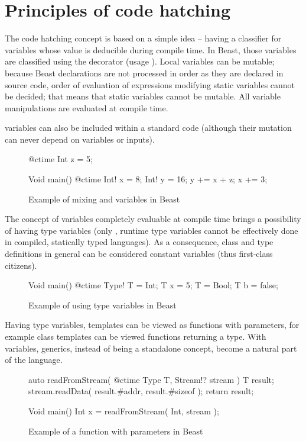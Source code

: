 \documentclass{ExcelAtFIT}
\begin{document}
\section{Principles of code hatching}

The code hatching concept is based on a simple idea -- having a classifier for variables whose value is deducible during compile time. In Beast, those variables are classified using the  decorator (usage ). Local \ctime variables can be mutable; because Beast declarations are not processed in order as they are declared in source code, order of evaluation of expressions modifying static \ctime variables cannot be decided; that means that static \ctime variables cannot be mutable. All \ctime variable manipulations are evaluated at compile time.

\ctime variables can also be included within a standard code (although their mutation can never depend on \nonctime variables or inputs).

\begin{figure}[h]
	\begin{code}
@ctime Int z = 5;
		
Void main() {
	@ctime Int! x = 8;
	Int! y = 16;
	y += x + z;
	x += 3;
}
	\end{code}
	\caption{Example of mixing \ctime and \nonctime variables in Beast}
\end{figure}

The concept of variables completely evaluable at compile time brings a possibility of having type variables (only \ctime, runtime type variables cannot be effectively done in compiled, statically typed languages). As a consequence, class and type definitions in general can be considered \ctime constant variables (thus first-class citizens).

\begin{figure}[h]
	\begin{code}
Void main() {
	@ctime Type! T = Int;
	T x = 5;
	T = Bool;
	T b = false;
}
	\end{code}
	\caption{Example of using type variables in Beast}
\end{figure}

Having type variables, templates can be viewed as functions with \ctime parameters, for example class templates can be viewed functions returning a type. With \ctime variables, generics, instead of being a standalone concept, become a natural part of the language.

\begin{figure}[h]
	\begin{code}
auto readFromStream( @ctime Type T, Stream!? stream )
{
	T result;
	stream.readData( result.#addr, result.#sizeof );
	return result;
}

Void main() {
	Int x = readFromStream( Int, stream );
}
	\end{code}
	\caption{Example of a function with \ctime parameters in Beast}
\end{figure}
\end{document}
